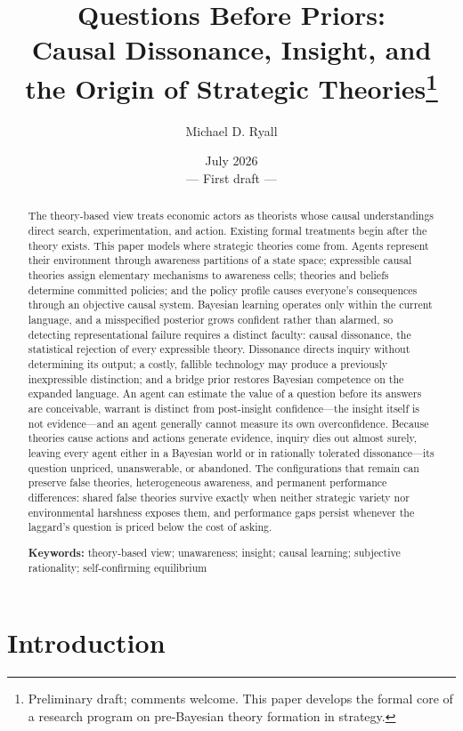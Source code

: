 \documentclass[11pt]{article}
\title{\textbf{Questions Before Priors:}\\
Causal Dissonance, Insight, and the Origin of Strategic Theories\thanks{%
Preliminary draft; comments welcome.  This paper develops the formal core of
a research program on pre-Bayesian theory formation in strategy.}}
\author{Michael D. Ryall}
\date{July 2026\\[0.4em]\normalsize --- First draft ---}
\theoremstyle{definition}
\begin{document}
\maketitle

\begin{abstract}
\noindent
The theory-based view treats economic actors as theorists whose causal
understandings direct search, experimentation, and action.  Existing formal
treatments begin after the theory exists.  This paper models where strategic
theories come from.  Agents represent their environment through awareness
partitions of a state space; expressible causal theories assign elementary
mechanisms to awareness cells; theories and beliefs determine committed
policies; and the policy profile causes everyone's consequences through an
objective causal system.  Bayesian learning operates only within the current
language, and a misspecified posterior grows confident rather than alarmed,
so detecting representational failure requires a distinct faculty: causal
dissonance, the statistical rejection of every expressible theory.
Dissonance directs inquiry without determining its output; a costly, fallible
technology may produce a previously inexpressible distinction; and a bridge
prior restores Bayesian competence on the expanded language.  An agent can
estimate the value of a question before its answers are conceivable, warrant
is distinct from post-insight confidence---the insight itself is not
evidence---and an agent generally cannot measure its own overconfidence.
Because theories cause actions and actions generate evidence, inquiry dies out
almost surely, leaving every agent either in a Bayesian world or in rationally
tolerated dissonance---its question unpriced, unanswerable, or abandoned.  The
configurations that remain can preserve false theories, heterogeneous
awareness, and permanent performance differences: shared false theories
survive exactly when neither strategic variety nor environmental harshness
exposes them, and performance gaps persist whenever the laggard's question is
priced below the cost of asking.
\medskip

\noindent\textbf{Keywords:} theory-based view; unawareness; insight; causal
learning; subjective rationality; self-confirming equilibrium
\end{abstract}

\newpage

\section{Introduction}
\label{sec:intro}
\end{document}
